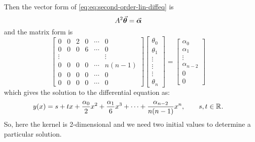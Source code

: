 \documentclass[../MathsNotesBase.tex]{subfiles}
\begin{document}
{		Then the vector form of \autoref{eq:eq:second-order-lin-diffeq} is
		\begin{equation}
			A^2 \vec{\bm{\theta}} = \vec{\bm{\alpha}}
		\end{equation}
		and the matrix form is
		\begin{equation}
			\begin{bmatrix}
			0 & 0 & 2 & 0 & \cdots & 0\\
			0 & 0 & 0 & 6 & \cdots & 0\\
			\vdots &  &  &  &  & \vdots\\
			0 & 0 & 0 & 0 & \cdots & n(n-1)\\
			0 & 0 & 0 & 0 & \cdots & 0\\
			0 & 0 & 0 & 0 & \cdots & 0
			\end{bmatrix}\begin{bmatrix}\theta_0\\\theta_1\\\vdots\\\vdots\\\vdots\\\theta_n\end{bmatrix} = \begin{bmatrix}\alpha_0\\\alpha_1\\\vdots\\\alpha_{n-2}\\0\\0\end{bmatrix}
		\end{equation}
		which gives the solution to the differential equation as:
		\begin{equation}\label{eq:general-first-order-lin-diff-eq-soln}
		y(x) = s + tx + \frac{\alpha_0}{2} x^2 + \frac{\alpha_1}{6} x^3 + \cdots + \frac{\alpha_{n-2}}{n(n-1)} x^n, \hspace{20pt} s,t \in \mathbb{R}^{}.
		\end{equation}
		So, here the kernel is 2-dimensional and we need two initial values to determine a particular solution.
		
		\bigskip
}
\end{document}
